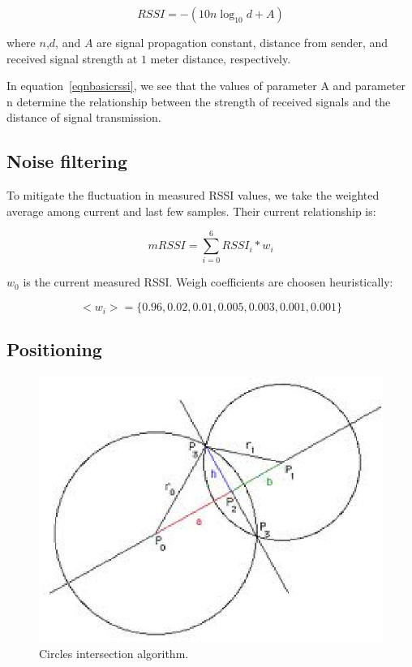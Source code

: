 \documentclass[conference,a4paper]{../../sty/IEEEtran}
\begin{document}
\begin{equation}
  RSSI = -(10n \log_{10}d + A)
 \label{eqnbasicrssi}
\end{equation}

where $n$,$d$, and $A$ are signal propagation constant, distance from sender, and received signal strength at $1$ meter distance, respectively.

In equation~\ref{eqnbasicrssi}, we see that the values of parameter A and parameter n determine the relationship between the strength of received signals and the distance of signal transmission.

\subsection{Noise filtering}

To mitigate the fluctuation in measured RSSI values, we take the weighted average among current and last few samples.
Their current relationship is:

\begin{equation}
mRSSI = \sum_{i=0}^{6} RSSI_i * w_i
\end{equation}

$w_0$ is the current measured RSSI.
Weigh coefficients are choosen heuristically:

\begin{equation}
<w_i> = \{ 0.96, 0.02, 0.01, 0.005, 0.003, 0.001, 0.001 \}
\end{equation}

\subsection{Positioning}

\begin{figure}[h!]
\centering
\includegraphics[scale=0.7]{intr.eps}
\caption{Circles intersection algorithm.\cite{cshint}}
\label{fig2}
\end{figure}
\end{document}
